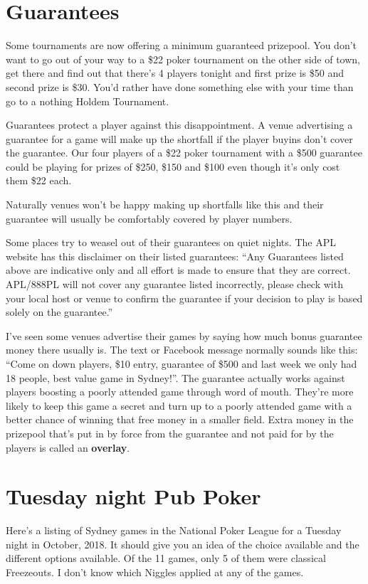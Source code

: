 \section{Guarantees}

Some tournaments are now offering a minimum guaranteed prizepool. You
don't want to go out of your way to a \$22 poker tournament on the
other side of town, get there and find out that there's 4 players tonight
and first prize is \$50 and second prize is \$30. You'd rather have
done something else with your time than go to a nothing Holdem Tournament.

Guarantees protect a player against this disappointment. A venue
advertising a guarantee for a game will make up the shortfall if the
player buyins don't cover the guarantee. Our four players of a \$22
poker tournament with a \$500 guarantee could be playing for prizes
of \$250, \$150 and \$100 even though it's only cost them \$22 each.

Naturally venues won't be happy making up shortfalls like this and
their guarantee will usually be comfortably covered by player numbers.

Some places try to weasel out of their guarantees on quiet nights.
The APL website has this disclaimer on their listed guarantees:
``Any Guarantees listed above are indicative only and all effort
is made to ensure that they are correct. APL/888PL will not cover
any guarantee listed incorrectly, please check with your local
host or venue to confirm the guarantee if your decision to
play is based solely on the guarantee.''

I've seen some venues advertise their games by saying how much bonus
guarantee money there usually is. The text or Facebook message
normally sounds like this: ``Come on down players, \$10 entry,
guarantee of \$500 and last week we only had 18 people, best value
game in Sydney!''. The guarantee actually works against players
boosting a poorly attended game through word of
mouth. They're more likely to keep this game a secret and turn up to a
poorly attended game with a better chance of winning that free money
in a smaller field. Extra money in the prizepool that's put in by force
from the guarantee and not paid for by the players is called an
\textbf{overlay}.

\section{Tuesday night Pub Poker}

Here's a listing of Sydney games in the National Poker League
for a Tuesday night in October, 2018. It should give you an
idea of the choice available and the different options available.
Of the 11 games, only 5 of them were classical Freezeouts.
I don't know which Niggles applied at any of the games.


